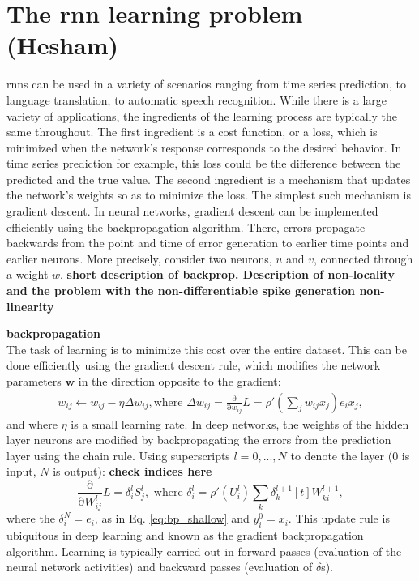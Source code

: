 \documentclass[journal,onecolumn,11pt]{IEEEtran}
\begin{document}
\section{The \gls{rnn} learning problem (Hesham)}
\glspl{rnn} can be used in a variety of scenarios ranging from time series prediction, to language translation, to automatic speech recognition. While there is a large variety of applications, the ingredients of the learning process are typically the same throughout. The first ingredient is a cost function, or a loss, which is minimized when the network's response corresponds to the desired behavior. In time series prediction for example, this loss could be the difference between the predicted and the true value. The second ingredient is a mechanism that updates the network's weights so as to minimize the loss. The simplest such mechanism is gradient descent. In neural networks, gradient descent can be implemented efficiently using the backpropagation algorithm.  There, errors propagate backwards from the point and time of error generation to earlier time points and earlier neurons. More precisely, consider two neurons, $u$ and $v$, connected through a weight $w$.
{\bf short description of backprop. Description of non-locality and the problem with the non-differentiable spike generation non-linearity}

{\bf backpropagation}\\
The task of learning is to minimize this cost over the entire dataset.
  This can be done efficiently using the gradient descent rule, which modifies the network parameters $\mathbf{w}$ in the direction opposite to the gradient:
  \begin{equation}\label{eq:bp_shallow}
    \begin{split}
      w_{ij} \leftarrow w_{ij} - \eta \Delta w_{ij},  \text{where } \Delta w_{ij} = \frac{\mathrm{\partial}}{\mathrm{\partial} w_{ij}} L = \rho'\left(\sum_j w_{ij} x_j\right) e_i x_j,
    \end{split}
  \end{equation}
  and where $\eta$ is a small learning rate. 
  In deep networks, the weights of the hidden layer neurons are modified by backpropagating the errors from the prediction layer using the chain rule. 
    Using superscripts $l=0,...,N$ to denote the layer ($0$ is input, $N$ is output):
  {\bf check indices here}
  \begin{equation}\label{eq:bp_deep}
    \frac{\mathrm{\partial}}{\mathrm{\partial} W^{l}_{ij}} L = \delta_{i}^{l}  S^{l}_j,\text{ where }\delta_{i}^{l} = \rho'\left( U_i^l \right) \sum_k \delta_{k}^{l+1}[t] W_{ki}^{l+1},
  \end{equation}
    where the $\delta_{i}^N=e_i$, as in Eq. \ref{eq:bp_shallow} and $y_{i}^0=x_i$.
  This update rule is ubiquitous in deep learning \cite{Rumelhart_etal88_paradist} and known as the gradient backpropagation algorithm.   
  Learning is typically carried out in forward passes (evaluation of the neural network activities) and backward passes (evaluation of $\delta$s).
\end{document}
